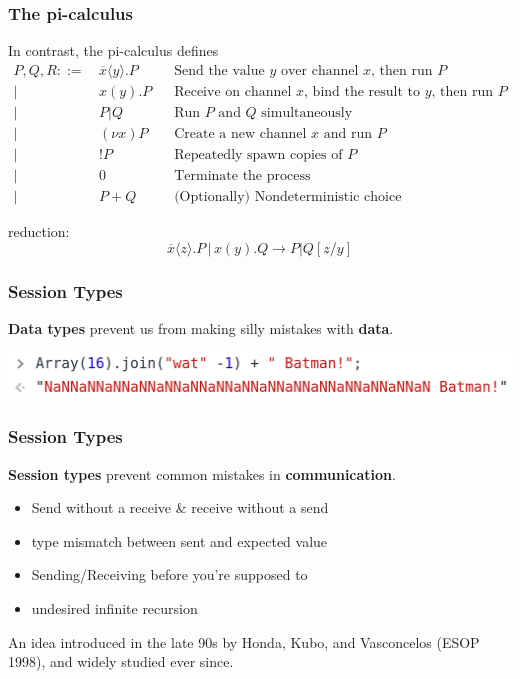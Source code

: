 \documentclass[12pt]{beamer}
\begin{document}
\begin{frame}
\frametitle{The pi-calculus}
In contrast, the pi-calculus defines
\begingroup
\fontsize{10pt}{12pt}\selectfont
\begin{align*}
P, Q, R ::= \, & \overline{x} \langle y \rangle.P \,\,\, \, \, &\text{Send the value }y\text{ over channel }x\text{, then run }P \\
|\,\,\, & x(y).P \,\,\, \, \, & \text{Receive on channel }x\text{, bind the result to }y\text{, then run }P \\
|\,\,\, & P|Q \,\,\, \, \, \, \, \, \, &\text{Run }P\text{ and }Q\text{ simultaneously} \\
|\,\,\, & (\nu x)P  \,\,\, &\text{Create a new channel }x\text{ and run }P \\
|\,\,\, & !P \,\,\, &\text{Repeatedly spawn copies of }P \\
|\,\,\, & 0 & \text{Terminate the process} \\
|\,\,\, & P + Q & \text{(Optionally) Nondeterministic choice}
\end{align*}
\endgroup


reduction: 
$$\overline{x}\langle z \rangle.P\, |\, x(y).Q \rightarrow P | Q[z/y]$$


\end{frame}


\begin{frame}[t]
\frametitle{Session Types}

\begin{center}
    \textbf{Data types} prevent us from making silly mistakes with \textbf{data}. \linebreak 

\begin{center}
\includegraphics[scale=0.30]{img/batman.png}
\end{center}

\end{center}




\end{frame}

\begin{frame}[t]
\frametitle{Session Types}
    \textbf{Session types} prevent common mistakes in \textbf{communication}.  

\begin{itemize}
    \item Send without a receive \& receive without a send
    \item type mismatch between sent and expected value
    \item Sending/Receiving before you're supposed to
    \item undesired infinite recursion
\end{itemize}

An idea introduced in the late 90s by Honda, Kubo, and Vasconcelos (ESOP 1998), and widely studied ever since. 

\end{frame}
\end{document}

